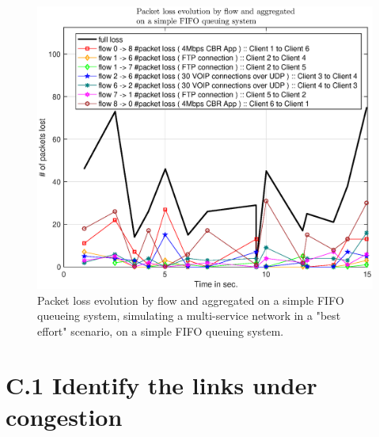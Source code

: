 \documentclass[conference,compsoc]{IEEEtran}
\begin{document}
    
    \begin{figure}[H]
    \centering
    \includegraphics[width=1\columnwidth]{EPS/B/loss_b1.eps}
    \caption{Packet loss evolution by flow and aggregated on a simple FIFO queueing system, simulating a multi-service network in a "best effort" scenario,  on a simple FIFO queuing system.}
\label{graph:loss_b11}
    \end{figure}

    
    \section{C.1 Identify the links under congestion}
    
\end{document}
